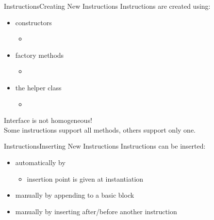 \begin{frame}{Instructions}{Creating New Instructions}
Instructions are created using:

\begin{itemize}
\item constructors
\begin{itemize}
\item {}
\end{itemize}
\item factory methods
\begin{itemize}
\item {}
\end{itemize}
\item the helper class 
\begin{itemize}
\item {}\\
\end{itemize}
\end{itemize}
\vfill
\alert{Interface is not homogeneous!}\\
Some instructions support all methods, others support only one.
\end{frame}


\begin{frame}{Instructions}{Inserting New Instructions}
\vfill
Instructions can be inserted:
\vfill
\begin{itemize}
\item automatically by 
\begin{itemize}
\item insertion point is given at  instantiation
\end{itemize}
\bigskip
\item manually by appending to a basic block
\item manually by inserting after/before another instruction
\end{itemize}
\vfill
\end{frame}


